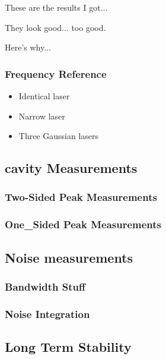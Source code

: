 These are the results I got...

They look good... too good.

Here's why...\cite{richter_linewidth_1986}

\subsubsection{Frequency Reference}
\begin{itemize}
\item Identical laser
\item Narrow laser
\item Three Gaussian lasers
\end{itemize}

\subsection{cavity Measurements}

\subsubsection{Two-Sided Peak Measurements}

\subsubsection{One_Sided Peak Measurements}

\subsection{Noise measurements}

\subsubsection{Bandwidth Stuff}

\subsubsection{Noise Integration}

\subsection{Long Term Stability}

